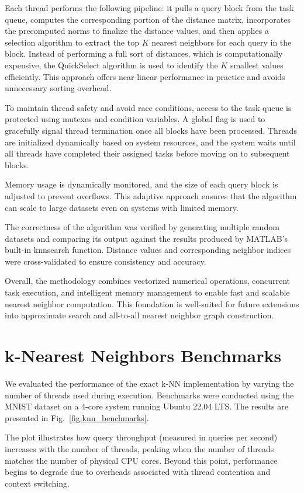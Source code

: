 \documentclass[conference]{IEEEtran}
\begin{document}
Each thread performs the following pipeline: it pulls a query block from the task queue, computes the 
corresponding portion of the distance matrix, incorporates the precomputed norms to finalize the distance 
values, and then applies a selection algorithm to extract the top $K$ nearest neighbors for each query in 
the block. Instead of performing a full sort of distances, which is computationally expensive, the QuickSelect 
algorithm is used to identify the $K$ smallest values efficiently. This approach offers near-linear performance 
in practice and avoids unnecessary sorting overhead.

To maintain thread safety and avoid race conditions, access to the task queue is protected using mutexes and 
condition variables. A global flag is used to gracefully signal thread termination once all blocks have been
processed. Threads are initialized dynamically based on system resources, and the system waits until all threads 
have completed their assigned tasks before moving on to subsequent blocks.

Memory usage is dynamically monitored, and the size of each query block is adjusted to prevent overflows. This
adaptive approach ensures that the algorithm can scale to large datasets even on systems with limited memory.

The correctness of the algorithm was verified by generating multiple random datasets and comparing its output 
against the results produced by MATLAB's built-in knnsearch function. Distance values and corresponding neighbor 
indices were cross-validated to ensure consistency and accuracy.

Overall, the methodology combines vectorized numerical operations, concurrent task execution, and intelligent 
memory management to enable fast and scalable nearest neighbor computation. This foundation is well-suited for 
future extensions into approximate search and all-to-all nearest neighbor graph construction.

\section{k-Nearest Neighbors Benchmarks}

We evaluated the performance of the exact k-NN implementation by varying the number of threads used during 
execution. Benchmarks were conducted using the MNIST dataset on a 4-core system running Ubuntu 22.04 LTS. 
The results are presented in Fig.~\ref{fig:knn_benchmarks}.

The plot illustrates how query throughput (measured in queries per second) increases with the number of threads,
peaking when the number of threads matches the number of physical CPU cores. Beyond this point, performance 
begins to degrade due to overheads associated with thread contention and context switching.
\end{document}
